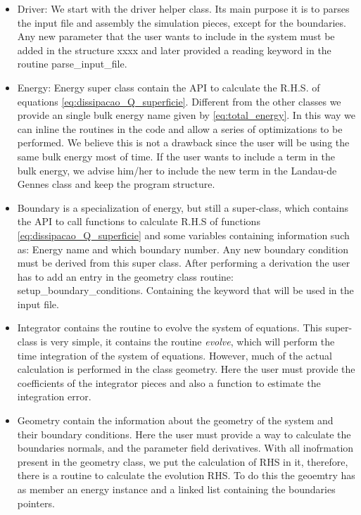 \documentclass[final,5p,times,twocolumn]{elsarticle}
\begin{document}
\begin{itemize}

\item Driver: We start with the driver helper class. Its main purpose
  it is to parses the input file and assembly the simulation pieces,
  except for the boundaries. Any new parameter that the user wants to
  include in the system must be added in the structure xxxx and later
  provided a reading keyword in the routine parse_input_file.


  
\item Energy: Energy super class contain the API to calculate the
  R.H.S. of equations \eqref{eq:dissipacao_Q_superficie}. Different
  from the other classes we provide an single bulk energy name given
  by \eqref{eq:total_energy}. In this way we can inline the routines
  in the code and allow a series of optimizations to be performed. We
  believe this is not a drawback since the user will be using the same
  bulk energy most of time. If the user wants to include a term in the
  bulk energy, we advise him/her to include the new term in the
  Landau-de Gennes class and keep the program structure.
  
\item Boundary is a specialization of energy, but still a super-class,
  which contains the API to call functions to calculate R.H.S of
  functions \eqref{eq:dissipacao_Q_superficie} and some variables
  containing information such as: Energy name and which boundary
  number. Any new boundary condition must be derived from this super
  class. After performing a derivation the user has to add an entry in
  the geometry class routine: setup_boundary_conditions. Containing
  the keyword that will be used in the input file.

\item Integrator contains the routine to evolve the system of
  equations. This super-class is very simple, it contains the routine
  \textit{evolve}, which will perform the time integration of the
  system of equations. However, much of the actual calculation is
  performed in the class geometry. Here the user must provide the
  coefficients of the integrator pieces and also a function to
  estimate the integration error.

\item Geometry contain the information about the geometry of the
  system and their boundary conditions. Here the user must provide a
  way to calculate the boundaries normals, and the parameter field
  derivatives. With all inofrmation present in the geometry class, we
  put the calculation of RHS in it, therefore, there is a routine to
  calculate the evolution RHS. To do this the geoemtry has as member
  an energy instance and a linked list containing the boundaries
  pointers.


\end{itemize}
\end{document}
